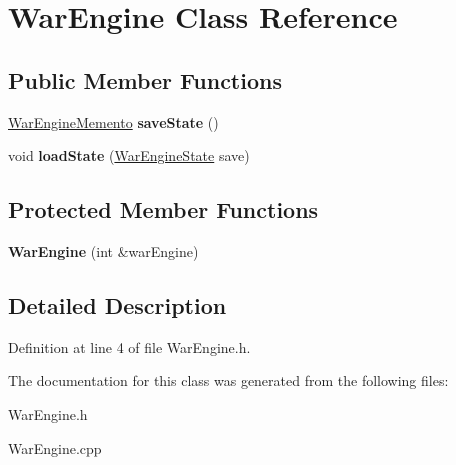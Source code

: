 \hypertarget{classWarEngine}{}\section{War\+Engine Class Reference}
\label{classWarEngine}
\subsection*{Public Member Functions}
\begin{DoxyCompactItemize}
\item 
\mbox{\label{classWarEngine_a3ce98b4a76487348a712a4ffb54a71f2}} 
\hyperlink{classWarEngineMemento}{War\+Engine\+Memento} {\bfseries save\+State} ()
\item 
\mbox{\label{classWarEngine_a76994dd9d009fff3dd272a87710bfae5}} 
void {\bfseries load\+State} (\hyperlink{classWarEngineState}{War\+Engine\+State} save)
\end{DoxyCompactItemize}
\subsection*{Protected Member Functions}
\begin{DoxyCompactItemize}
\item 
\mbox{\label{classWarEngine_a0c3e8e1ca61c1e85ffcbbaa26b9a749c}} 
{\bfseries War\+Engine} (int \&war\+Engine)
\end{DoxyCompactItemize}


\subsection{Detailed Description}


Definition at line 4 of file War\+Engine.\+h.



The documentation for this class was generated from the following files\+:\begin{DoxyCompactItemize}
\item 
War\+Engine.\+h\item 
War\+Engine.\+cpp\end{DoxyCompactItemize}
